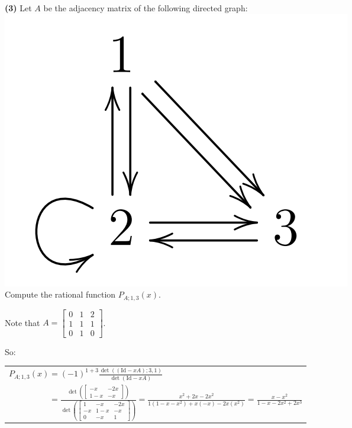 \documentclass{book}
\newcommand{\exOne}{%
   \color{Purple}%
   \fontsize{13}{15}\selectfont%
}
\newenvironment{myIndent}{%
   \begin{adjustwidth}{2.5em}{0em}%
}{%
   \end{adjustwidth}%
}
\newcommand{\blab}[1]{\textbf{#1}}
\newcommand{\myId}{\mathrm{Id}}
\newcommand{\retTwo}{\hfill\bigbreak}
\begin{document}
\blab{(3)} Let $A$ be the adjacency matrix of the following directed graph:\\ [-44pt] \phantom{Let $A$ be the adjacency matrix of the following directed graph:aaa} \includegraphics[scale=0.3]{188-HW5_Q3.png}\\ [-44pt]

Compute the rational function $P_{A;1,3}(x)$.

\begin{myIndent}\exOne
   Note that $A = \left[
   \begin{matrix}
      0 & 1 & 2 \\ 1 & 1 & 1 \\ 0 & 1 & 0
   \end{matrix}\right]$.\retTwo

   So: 
   \begin{center}
      \begin{tabular}{l}
         $P_{A;1,3}(x) = (-1)^{1 + 3}\frac{\det((\myId - xA); 3, 1)}{\det(\myId - xA)}$\\ [14pt]
         
         $\phantom{P_{A;1,3}(x)} = \frac{\det(\left[
         \begin{smallmatrix}
             -x & -2x \\ 1-x & -x
         \end{smallmatrix}\right])}{\det(\left[\begin{smallmatrix}
            1 & -x & -2x \\ -x & 1-x & -x \\ 0 & -x & 1
        \end{smallmatrix}\right])} = \frac{x^2 +2x - 2x^2}{1(1-x -x^2) + x(-x) -2x(x^2)} = \frac{x - x^2}{1 - x -2x^2 + 2x^3}$
      \end{tabular}
   \end{center}
   \retTwo\retTwo
\end{myIndent}
\end{document}
